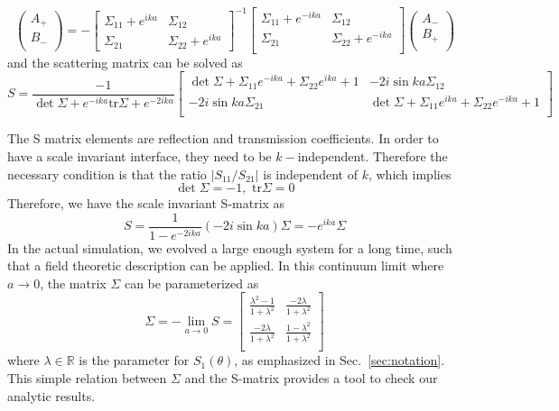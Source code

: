 \begin{widetext}
\begin{equation}
\label{eq:discrete_S}
\begin{pmatrix}
A_{+} \\
B_{-}\\
\end{pmatrix}
=-
\begin{bmatrix}
\Sigma_{11} +e^{ika} & \Sigma_{12}\\
\Sigma_{21} & \Sigma_{22} + e^{ika}
\end{bmatrix}^{-1}
\begin{bmatrix}
\Sigma_{11} + e^{-ika} & \Sigma_{12} \\
\Sigma_{21} & \Sigma_{22}  + e^{-ika}  \\
\end{bmatrix}
\begin{pmatrix}
A_{-}\\
B_{+}\\
\end{pmatrix}
\end{equation}
and the scattering matrix can be solved as
\begin{equation}
  S = \frac{-1}{ \det \Sigma  + e^{-ika} \text{tr} \Sigma   + e^{-2ika}}
\begin{bmatrix}
\det \Sigma+ \Sigma_{11} e^{-ika} + \Sigma_{22} e^{ika}+1  & -2i \sin ka \Sigma_{12}  \\
-2i \sin ka \Sigma_{21} &  \det \Sigma+ \Sigma_{11} e^{ika} + \Sigma_{22} e^{-ika}+1\\
\end{bmatrix}
\end{equation}
\end{widetext}
The S matrix elements are reflection and transmission coefficients. In order to have a scale invariant interface, they need to be $k-$independent. Therefore the necessary condition is that the ratio $|S_{11}/S_{21}|$ is independent of $k$, which implies 
\begin{equation}
\label{eq:Sigma_condition}
\det \Sigma = -1, \, \, \text{tr} \Sigma = 0
\end{equation}
Therefore, we have the scale invariant S-matrix as
\begin{equation}
S = \frac{1}{1 - e^{-2ika } } ( -2i \sin ka ) \Sigma
 = - e^{ika} \Sigma
\end{equation}
In the actual simulation, we evolved a large enough system for a long time, such that a field theoretic description can be applied. In this continuum limit where $a\rightarrow0$, the matrix $\Sigma$ can be parameterized as
\begin{equation}
\Sigma = -\lim_{a \rightarrow 0 } S = 
\begin{bmatrix}
\frac{\lambda^2- 1}{1 + \lambda^2} & \frac{-2\lambda }{1 + \lambda^2} \\
\frac{-2\lambda }{1 + \lambda^2} & \frac{1- \lambda^2}{1 + \lambda^2} \\
\end{bmatrix}
\end{equation}
where $\lambda\in\mathbb{R}$ is the parameter for $S_1(\theta)$, as emphasized in Sec.~\ref{sec:notation}. This simple relation between $\Sigma$ and the S-matrix provides a tool to check our analytic results. 

